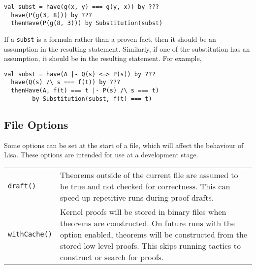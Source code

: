 \begin{lstlisting}[language=lisa]
  val subst = have(g(x, y) === g(y, x)) by ???
  have(P(g(3, 8))) by ???
  thenHave(P(g(8, 3))) by Substitution(subst)
\end{lstlisting}

If a \lstinline|subst| is a formula rather than a proven fact, then it should be
an assumption in the resulting statement. Similarly, if one of the substitution
has an assumption, it should be in the resulting statement. For example,

\begin{lstlisting}[language=lisa]
  val subst = have(A |- Q(s) <=> P(s)) by ???
  have(Q(s) /\ s === f(t)) by ???
  thenHave(A, f(t) === t |- P(s) /\ s === t) 
        by Substitution(subst, f(t) === t)
\end{lstlisting}

\subsection*{File Options}
Some options can be set at the start of a file, which will affect the behaviour
of Lisa. These options are intended for use at a development stage.

\vspace{2em}
\begin{tabularx}{0.9\columnwidth}{|l|X|}
  \lstinline|draft()| & Theorems outside of the current file are assumed to be
  true and not checked for correctness. This can speed up repetitive runs during
  proof drafts. \\[4ex]
  \lstinline|withCache()| & Kernel proofs will be stored in binary files when
  theorems are constructed. On future runs with the option enabled, theorems
  will be constructed from the stored low level proofs. This skips running
  tactics to construct or search for proofs.\\

\end{tabularx}